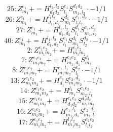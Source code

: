 \documentclass[letterpaper,10pt,fleqn,leqno,onecolumn]{article}
\begin{document}
\begin{equation} \;\;\;\;\;\;  25: Z^{e_{1}}_{m_{1}}+=H^{l_{1},l_{2}}_{d_{1}d_{2}}S^{e_{1}}_{l_{1}}S^{d_{1}d_{2}}_{m_{1},l_{2}}\cdot -1/1 \end{equation}
\begin{equation} \;\;\;\;\;\;  26: Z^{e_{1}}_{m_{1}}+=H^{l_{1}l_{2}}_{d_{1},d_{2}}S^{d_{1}}_{m_{1}}S^{e_{1},d_{2}}_{l_{1}l_{2}}\cdot -1/1 \end{equation}
\begin{equation} \;\;\;\;\;\;  27: Z^{e_{1}}_{m_{1}}+=H^{l_{1},l_{2}}_{d_{1},d_{2}}S^{d_{1}}_{l_{1}}S^{e_{1},d_{2}}_{m_{1},l_{2}} \end{equation}
\begin{equation} \;\;\;\;\;\;  40: Z^{e_{1}}_{m_{1}}+=H^{l_{1},l_{2}}_{d_{1},d_{2}}S^{e_{1}}_{l_{1}}S^{d_{1}}_{m_{1}}S^{d_{2}}_{l_{2}}\cdot -1/1 \end{equation}
\begin{equation} \;\;\;\;\;\;  2: Z^{e_{1}e_{2}}_{m_{1}m_{2}}+=H^{e_{1}e_{2}}_{m_{1}m_{2}} \end{equation}
\begin{equation} \;\;\;\;\;\;  7: Z^{e_{1}e_{2}}_{m_{1}m_{2}}+=H^{e_{1}e_{2}}_{m_{1},d_{1}}S^{d_{1}}_{m_{2}} \end{equation}
\begin{equation} \;\;\;\;\;\;  8: Z^{e_{1}e_{2}}_{m_{1}m_{2}}+=H^{e_{1},l_{1}}_{m_{1}m_{2}}S^{e_{2}}_{l_{1}}\cdot -1/1 \end{equation}
\begin{equation} \;\;\;\;\;\;  13: Z^{e_{1}e_{2}}_{m_{1}m_{2}}+=H^{e_{1}}_{d_{1}}S^{e_{2},d_{1}}_{m_{1}m_{2}}\cdot -1/1 \end{equation}
\begin{equation} \;\;\;\;\;\;  14: Z^{e_{1}e_{2}}_{m_{1}m_{2}}+=H^{l_{1}}_{m_{1}}S^{e_{1}e_{2}}_{m_{2},l_{1}} \end{equation}
\begin{equation} \;\;\;\;\;\;  15: Z^{e_{1}e_{2}}_{m_{1}m_{2}}+=H^{e_{1}e_{2}}_{d_{1}d_{2}}S^{d_{1}d_{2}}_{m_{1}m_{2}} \end{equation}
\begin{equation} \;\;\;\;\;\;  16: Z^{e_{1}e_{2}}_{m_{1}m_{2}}+=H^{e_{1},l_{1}}_{m_{1},d_{1}}S^{e_{2},d_{1}}_{m_{2},l_{1}} \end{equation}
\begin{equation} \;\;\;\;\;\;  17: Z^{e_{1}e_{2}}_{m_{1}m_{2}}+=H^{l_{1}l_{2}}_{m_{1}m_{2}}S^{e_{1}e_{2}}_{l_{1}l_{2}} \end{equation}
\end{document}
